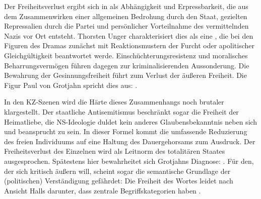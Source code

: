 Der Freiheitsverlust ergibt sich in  als
Abhängigkeit und Erpressbarkeit, die aus dem Zusammenwirken
einer allgemeinen Bedrohung durch den Staat, gezielten Repressalien durch die
Partei und persönlicher Vorteilnahme des vermittelnden Nazis vor Ort
entsteht.  
Thorsten Unger charakterisiert dies als eine \Cite{faktische Auflösung der
  Rechtssicherheit}, die bei den
Figuren des Dramas zunächst mit Reaktionsmustern der Furcht oder apolitischer
Gleichgültigkeit beantwortet werde. Einschüchterungsresistenz und moralisches
Beharrungsvermögen führen dagegen zur kriminalisierenden Aussonderung. Die
Bewahrung der Gesinnungsfreiheit führt zum Verlust der äußeren Freiheit. Die
Figur Paul von Grotjahn spricht dies aus: \Cite{Ein anständiger Mensch ist
  heute im Gefängnis.} . 

In den KZ-Szenen wird die Härte dieses Zusammenhangs noch brutaler
klargestellt. Der staatliche Antisemitismus beschränkt sogar die Freiheit der
Heimatliebe, 
die NS-Ideologie duldet kein anderes Glaubensbekanntnis neben sich und
beansprucht \Cite{größer als der Mensch}  zu sein. In
dieser Formel kommt die umfassende Reduzierung des freien Individuums auf eine
Haltung des Dauergehorsams zum Ausdruck.  
Der Freiheitsverlust des Einzelnen wird als Leitnorm des totalitären Staates
ausgesprochen. Spätestens hier bewahrheitet sich Grotjahns Diagnose: \Cite{Im
  totalen Staat gibt es nur eine private Affäre: den Tod.} .
Für den, der sich kritisch äußern will, scheint sogar die semantische
Grundlage der (politischen) Verständigung gefährdet: Die Freiheit des Wortes
leidet nach Ansicht Halls darunter, dass \Cite{die Diktatoren} zentrale
Begriffskategorien \Cite{gestohlen und um ihren Sinn gebracht} haben
. 

